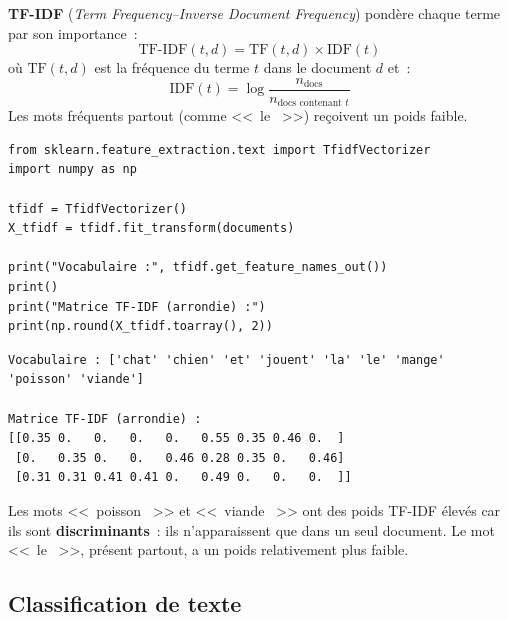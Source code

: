 
\begin{definition}[TF-IDF]
\textbf{TF-IDF} (\textit{Term Frequency--Inverse Document Frequency}) pond\`ere chaque terme par son importance~:
\[
\text{TF-IDF}(t, d) = \text{TF}(t, d) \times \text{IDF}(t)
\]
o\`u $\text{TF}(t,d)$ est la fr\'equence du terme $t$ dans le document $d$ et~:
\[
\text{IDF}(t) = \log\frac{n_{\text{docs}}}{n_{\text{docs contenant } t}}
\]
Les mots fr\'equents partout (comme <<~le ~>>) re\c{c}oivent un poids faible.
\end{definition}

\begin{codeblock}[title=\textbf{Python}]
\begin{verbatim}
from sklearn.feature_extraction.text import TfidfVectorizer
import numpy as np

tfidf = TfidfVectorizer()
X_tfidf = tfidf.fit_transform(documents)

print("Vocabulaire :", tfidf.get_feature_names_out())
print()
print("Matrice TF-IDF (arrondie) :")
print(np.round(X_tfidf.toarray(), 2))
\end{verbatim}
\end{codeblock}

\begin{codeoutput}
\begin{verbatim}
Vocabulaire : ['chat' 'chien' 'et' 'jouent' 'la' 'le' 'mange' 'poisson' 'viande']

Matrice TF-IDF (arrondie) :
[[0.35 0.   0.   0.   0.   0.55 0.35 0.46 0.  ]
 [0.   0.35 0.   0.   0.46 0.28 0.35 0.   0.46]
 [0.31 0.31 0.41 0.41 0.   0.49 0.   0.   0.  ]]
\end{verbatim}
\end{codeoutput}

\begin{intuition}
Les mots <<~poisson ~>> et <<~viande ~>> ont des poids TF-IDF \'elev\'es car ils sont \textbf{discriminants}~: ils n'apparaissent que dans un seul document. Le mot <<~le ~>>, pr\'esent partout, a un poids relativement plus faible.
\end{intuition}

\subsection{Classification de texte}

